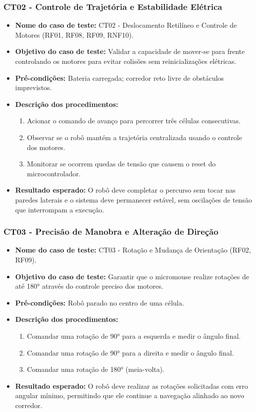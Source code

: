     \subsubsection{CT02 - Controle de Trajetória e Estabilidade Elétrica}
    \begin{itemize}
        \item \textbf{Nome do caso de teste:} CT02 - Deslocamento Retilíneo e Controle de Motores (RF01, RF08, RF09, RNF10).
        \item \textbf{Objetivo do caso de teste:} Validar a capacidade de mover-se para frente controlando os motores para evitar colisões sem reinicializações elétricas.
        \item \textbf{Pré-condições:} Bateria carregada; corredor reto livre de obstáculos imprevistos.
        \item \textbf{Descrição dos procedimentos:}
        \begin{enumerate}
            \item Acionar o comando de avanço para percorrer três células consecutivas.
            \item Observar se o robô mantém a trajetória centralizada usando o controle dos motores.
            \item Monitorar se ocorrem quedas de tensão que causem o reset do microcontrolador.
        \end{enumerate}
        \item \textbf{Resultado esperado:} O robô deve completar o percurso sem tocar nas paredes laterais e o sistema deve permanecer estável, sem oscilações de tensão que interrompam a execução.
    \end{itemize}

    \subsubsection{CT03 - Precisão de Manobra e Alteração de Direção}
    \begin{itemize}
        \item \textbf{Nome do caso de teste:} CT03 - Rotação e Mudança de Orientação (RF02, RF09).
        \item \textbf{Objetivo do caso de teste:} Garantir que o micromouse realize rotações de até 180° através do controle preciso dos motores.
        \item \textbf{Pré-condições:} Robô parado no centro de uma célula.
        \item \textbf{Descrição dos procedimentos:}
        \begin{enumerate}
            \item Comandar uma rotação de 90° para a esquerda e medir o ângulo final.
            \item Comandar uma rotação de 90° para a direita e medir o ângulo final.
            \item Comandar uma rotação de 180° (meia-volta).
        \end{enumerate}
        \item \textbf{Resultado esperado:} O robô deve realizar as rotações solicitadas com erro angular mínimo, permitindo que ele continue a navegação alinhado ao novo corredor.
    \end{itemize}

